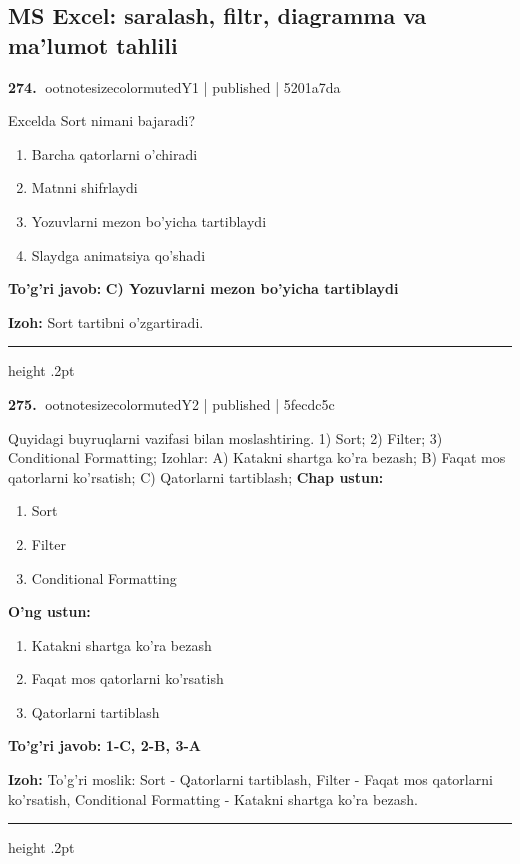\documentclass[10pt,a4paper]{article}
\begin{document}
\subsection{MS Excel: saralash, filtr, diagramma va ma'lumot tahlili}

\textbf{\color{ink}274.} {ootnotesizecolor{muted}Y1 | published | 5201a7da}
\par
Excelda Sort nimani bajaradi?
\begin{enumerate}[label=\Alph*),leftmargin=9mm]
\item Barcha qatorlarni o'chiradi
\item Matnni shifrlaydi
\item Yozuvlarni mezon bo'yicha tartiblaydi
\item Slaydga animatsiya qo'shadi
\end{enumerate}
\begin{tcolorbox}[enhanced,breakable,colback=teal!4,colframe=teal!55!black,boxrule=0.45pt,arc=1.2mm,left=2.8mm,right=2.8mm,top=2mm,bottom=2mm]
\textbf{\color{teal}To'g'ri javob:} \textbf{C) Yozuvlarni mezon bo'yicha tartiblaydi}
\par\smallskip
\textbf{Izoh:} Sort tartibni o'zgartiradi.
\end{tcolorbox}
\vspace{2mm}\hrule height .2pt\vspace{2mm}

\textbf{\color{ink}275.} {ootnotesizecolor{muted}Y2 | published | 5fecdc5c}
\par
Quyidagi buyruqlarni vazifasi bilan moslashtiring.  1) Sort;  2) Filter;  3) Conditional Formatting;  Izohlar: A) Katakni shartga ko'ra bezash;  B) Faqat mos qatorlarni ko'rsatish;  C) Qatorlarni tartiblash;
\textbf{Chap ustun:}\begin{enumerate}[label=\arabic*),leftmargin=9mm]
\item Sort
\item Filter
\item Conditional Formatting
\end{enumerate}
\textbf{O'ng ustun:}\begin{enumerate}[label=\Alph*),leftmargin=9mm]
\item Katakni shartga ko'ra bezash
\item Faqat mos qatorlarni ko'rsatish
\item Qatorlarni tartiblash
\end{enumerate}
\begin{tcolorbox}[enhanced,breakable,colback=teal!4,colframe=teal!55!black,boxrule=0.45pt,arc=1.2mm,left=2.8mm,right=2.8mm,top=2mm,bottom=2mm]
\textbf{\color{teal}To'g'ri javob:} \textbf{1-C, 2-B, 3-A}
\par\smallskip
\textbf{Izoh:} To'g'ri moslik: Sort - Qatorlarni tartiblash, Filter - Faqat mos qatorlarni ko'rsatish, Conditional Formatting - Katakni shartga ko'ra bezash.
\end{tcolorbox}
\vspace{2mm}\hrule height .2pt\vspace{2mm}
\end{document}
